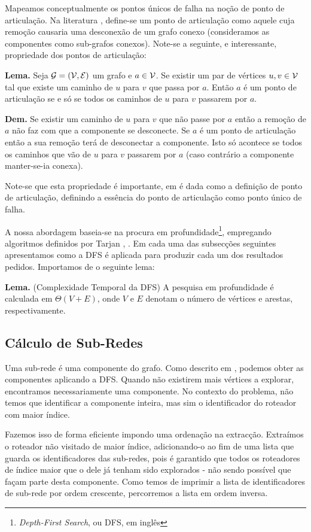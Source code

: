 \documentclass[a4paper, 12pt, conference, portuguese]{ieeeconf}
\begin{document}
Mapeamos conceptualmente os pontos únicos de falha na noção de ponto de
articulação. Na literatura \cite{cormen}, define-se um ponto de articulação como
aquele cuja remoção causaria uma desconexão de um grafo conexo (consideramos as
componentes como sub-grafos conexos). Note-se a seguinte, e interessante,
propriedade dos pontos de articulação:

\textbf{Lema.} Seja ${\cal G} = ({\cal V}, {\cal E})$ um grafo e $a \in {\cal
V}$. Se existir um par
de vértices $u, v \in {\cal V}$ tal que existe um caminho de $u$ para $v$ que passa por
$a$. Então $a$ é um ponto de
articulação se e só se todos os caminhos de $u$ para $v$ passarem por $a$.

\textbf{Dem.} Se existir um caminho de $u$ para $v$ que não passe por $a$ então
a remoção de $a$ não faz com que a componente se desconecte. Se $a$ é um ponto
de articulação então a sua remoção terá de desconectar a componente. Isto só
acontece se todos os caminhos que vão de $u$ para $v$ passarem por $a$ (caso
contrário a componente manter-se-ia conexa).

Note-se que esta propriedade é importante, em \cite{tarjan1} é dada como a
definição de ponto de articulação, definindo a essência do ponto de
articulação como ponto único de falha.

A nossa abordagem baseia-se na procura em
profundidade\footnote{\textit{Depth-First Search}, ou DFS, em inglês}, empregando algoritmos
definidos por Tarjan \cite{tarjan1}, \cite{tarjan2}. Em cada uma das subsecções
seguintes apresentamos como a DFS é aplicada para produzir cada um dos
resultados pedidos. Importamos de \cite{cormen} o seguinte lema:

\textbf{Lema.} (Complexidade Temporal da DFS) A pesquisa em profundidade é
calculada em $\Theta(V + E)$, onde $V$ e $E$ denotam o número de vértices e
arestas, respectivamente.


\subsection{Cálculo de Sub-Redes}
Uma sub-rede é uma componente do grafo. Como descrito em \cite{tarjan2}, podemos
obter as componentes aplicando a DFS. Quando não existirem mais vértices a
explorar, encontramos necessariamente uma componente.
No contexto do problema, não temos que
identificar a componente inteira, mas sim o identificador do roteador com maior
índice.

Fazemos isso de forma eficiente impondo uma ordenação na extracção.
Extraímos o roteador não visitado de maior índice, adicionando-o ao fim de uma
lista que guarda os identificadores das sub-redes, pois é garantido que todos os
roteadores de índice maior que o dele já tenham sido explorados - não sendo
possível que façam parte desta componente. Como temos de imprimir a
lista de identificadores de sub-rede por ordem crescente,
percorremos a lista em ordem inversa.
\end{document}
